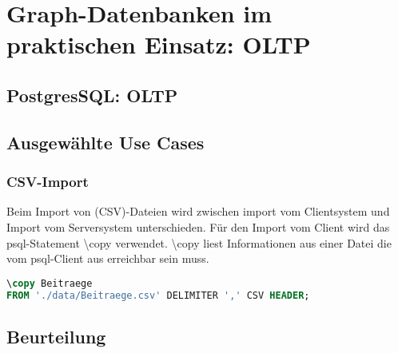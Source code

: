 \chapter{Graph-Datenbanken im praktischen Einsatz: OLTP}
\section{PostgresSQL: OLTP}
\section{Ausgewählte Use Cases}
\subsection{CSV-Import}
Beim Import von (CSV)-Dateien wird zwischen import vom Clientsystem und  Import vom Serversystem unterschieden. 
Für den Import vom Client wird das psql-Statement \textbackslash copy verwendet. \textbackslash copy liest Informationen aus einer Datei die vom psql-Client aus erreichbar sein muss. \cite{postgres2018}

\begin{lstlisting}[language=SQL,caption=CSV Input,frame=single]
\copy Beitraege 
FROM './data/Beitraege.csv' DELIMITER ',' CSV HEADER;
\end{lstlisting}


\section{Beurteilung}